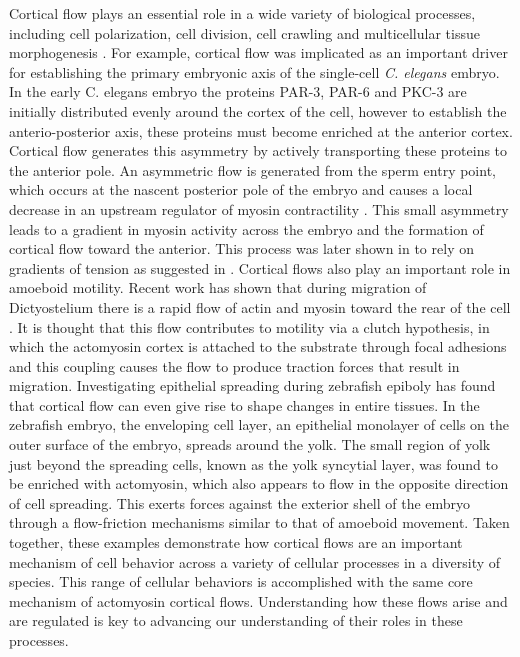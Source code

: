 Cortical flow plays an essential role in a wide variety of biological processes, including  cell polarization, cell division, cell crawling and multicellular tissue morphogenesis \cite{cellmech_flows3, cellmech_flows2, Benink:2000aa, Wilson:2010aa, Rauzi2010, Munro2004413}. For example, cortical flow was implicated as an important driver for establishing the primary embryonic axis of the  single-cell \textit{C. elegans} embryo. In the early C. elegans embryo the proteins PAR-3, PAR-6 and PKC-3 are initially distributed evenly around the cortex of the cell, however to establish the anterio-posterior axis, these proteins must become enriched at the anterior cortex. Cortical flow generates this asymmetry by actively transporting these proteins to the anterior pole. An asymmetric flow is generated from the sperm entry point, which occurs at the nascent posterior pole of the embryo and causes a local decrease in an upstream regulator of myosin contractility \cite{Munro2004413}. This small asymmetry leads to a gradient in myosin activity across the embryo and the formation of cortical flow toward the anterior. This process was later shown in \cite{cellmech_flows} to rely on gradients of tension as suggested in \cite{cellmech_flows3}. Cortical flows also play an important role in amoeboid motility\cite{wang1985exchange,Yumura200,okabe1991actin}. Recent work has shown that during migration of Dictyostelium there is a rapid flow of actin and myosin toward the rear of the cell \cite{Yumura200}. It is thought that this flow contributes to motility via a clutch hypothesis, in which the actomyosin cortex is attached to the substrate through focal adhesions and this coupling causes the flow to produce traction forces that result in migration\cite{wang1985exchange,okabe1991actin}. Investigating epithelial spreading during zebrafish epiboly has found that cortical flow can even give rise to shape changes in entire tissues.  In the zebrafish embryo, the enveloping cell layer, an epithelial monolayer of cells on the outer surface of the embryo, spreads around the yolk.  The small region of yolk just beyond the spreading cells, known as the yolk syncytial layer, was found to be enriched with actomyosin, which also appears to flow in the opposite direction of cell spreading. This exerts forces against the exterior shell of the embryo through a flow-friction mechanisms similar to that of  amoeboid movement. Taken together, these examples demonstrate how cortical flows are an important mechanism of cell behavior across a variety of cellular processes in a diversity of species.  This range of cellular behaviors is accomplished with the same core mechanism of actomyosin cortical flows.  Understanding how these flows arise and are regulated is key to advancing our understanding of their roles in these processes.

